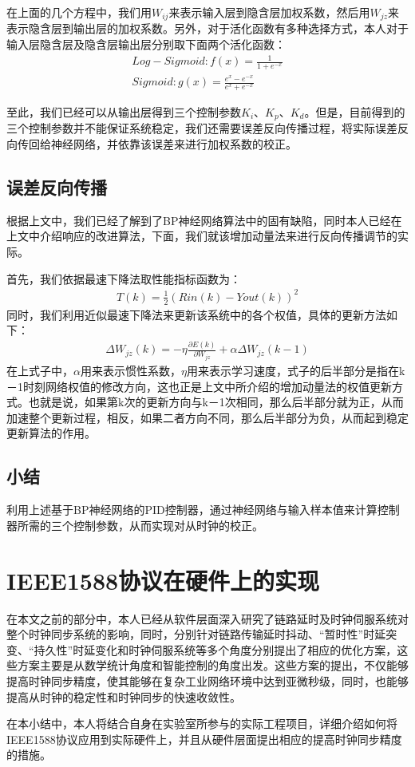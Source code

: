 在上面的几个方程中，我们用$W_{ij}$来表示输入层到隐含层加权系数，然后用$W_{jz}$来表示隐含层到输出层的加权系数。另外，对于活化函数有多种选择方式，本人对于输入层\-隐含层及隐含层\-输出层分别取下面两个活化函数：
\begin{align}
Log-Sigmoid : f(x) = \frac{1}{1 + e^{-x}} \\
Sigmoid : g(x) = \frac{e^{x} - e^{-x}}{e^{x} + e^{-x}}
\end{align}

至此，我们已经可以从输出层得到三个控制参数$K_{i}$、$K_{p}$、$K_{d}$。但是，目前得到的三个控制参数并不能保证系统稳定，我们还需要误差反向传播过程，将实际误差反向传回给神经网络，并依靠该误差来进行加权系数的校正。

\subsection{误差反向传播}
根据上文中，我们已经了解到了BP神经网络算法中的固有缺陷，同时本人已经在上文中介绍响应的改进算法，下面，我们就该增加动量法来进行反向传播调节的实际。

首先，我们依据最速下降法取性能指标函数为：
\begin{align}
T(k) = \frac{1}{2}(Rin(k) - Yout(k))^{2}
\end{align}
同时，我们利用近似最速下降法来更新该系统中的各个权值，具体的更新方法如下：
\begin{align}
\Delta W_{jz}(k) = -\eta \frac{\partial E(k)}{\partial W_{jz}} + \alpha \Delta W_{jz}(k-1)
\end{align}
在上式子中，$\alpha$用来表示惯性系数，$\eta$用来表示学习速度，式子的后半部分是指在k－1时刻网络权值的修改方向，这也正是上文中所介绍的增加动量法的权值更新方式。也就是说，如果第k次的更新方向与k－1次相同，那么后半部分就为正，从而加速整个更新过程，相反，如果二者方向不同，那么后半部分为负，从而起到稳定更新算法的作用。

\subsection{小结}
利用上述基于BP神经网络的PID控制器，通过神经网络与输入样本值来计算控制器所需的三个控制参数，从而实现对从时钟的校正。


\section{IEEE1588协议在硬件上的实现}
在本文之前的部分中，本人已经从软件层面深入研究了链路延时及时钟伺服系统对整个时钟同步系统的影响，同时，分别针对链路传输延时抖动、“暂时性”时延突变、“持久性”时延变化和时钟伺服系统等多个角度分别提出了相应的优化方案，这些方案主要是从数学统计角度和智能控制的角度出发。这些方案的提出，不仅能够提高时钟同步精度，使其能够在复杂工业网络环境中达到亚微秒级，同时，也能够提高从时钟的稳定性和时钟同步的快速收敛性。

在本小结中，本人将结合自身在实验室所参与的实际工程项目，详细介绍如何将IEEE1588协议应用到实际硬件上，并且从硬件层面提出相应的提高时钟同步精度的措施。






